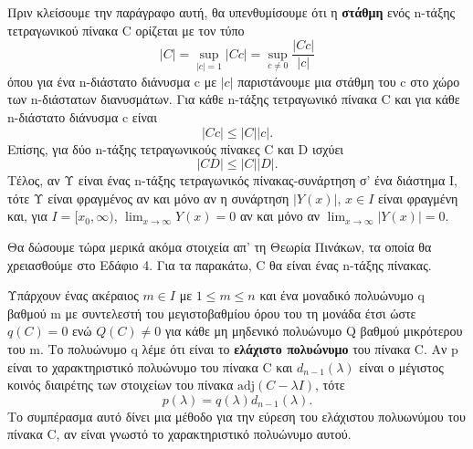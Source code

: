 \documentclass[11pt,a4paper,twoside]{book}
\begin{document}
Πριν κλείσουμε την παράγραφο αυτή, θα υπενθυμίσουμε ότι η \textbf{στάθμη} ενός n-τάξης τετραγωνικού πίνακα C ορίζεται με τον τύπο
\[
|C| = \sup_{|c|=1} |Cc| = \sup_{c\neq 0} \frac{|Cc|}{|c|}
\]
όπου για ένα n-διάστατο διάνυσμα c με $|c|$ παριστάνουμε μια στάθμη του c στο χώρο των n-διάστατων διανυσμάτων. Για κάθε n-τάξης τετραγωνικό πίνακα C και για κάθε n-διάστατο διάνυσμα c είναι
\[
|Cc| \leq |C||c|.
\]
Επίσης, για δύο n-τάξης τετραγωνικούς πίνακες C και D ισχύει
\[
|CD| \leq |C||D|.
\]
Τέλος, αν Υ είναι ένας n-τάξης τετραγωνικός πίνακας-συνάρτηση σ' ένα διάστημα Ι, τότε Υ είναι φραγμένος αν και μόνο αν η συνάρτηση $|Y(x)|$, $x \in I$ είναι φραγμένη και, για $I=[x_0, \infty)$, $\lim_{x\to\infty} Y(x) = 0$ αν και μόνο αν $\lim_{x\to\infty} |Y(x)| = 0$.

Θα δώσουμε τώρα μερικά ακόμα στοιχεία απ' τη Θεωρία Πινάκων, τα οποία θα χρειασθούμε στο Εδάφιο 4. Για τα παρακάτω, C θα είναι ένας n-τάξης πίνακας.

Υπάρχουν ένας ακέραιος $m \in I$ με $1 \leq m \leq n$ και ένα μοναδικό πολυώνυμο q βαθμού m με συντελεστή του μεγιστοβαθμίου όρου του τη μονάδα έτσι ώστε $q(C)=0$ ενώ $Q(C) \neq 0$ για κάθε μη μηδενικό πολυώνυμο Q βαθμού μικρότερου του m. Το πολυώνυμο q λέμε ότι είναι το \textbf{ελάχιστο πολυώνυμο} του πίνακα C. Αν p είναι το χαρακτηριστικό πολυώνυμο του πίνακα C και $d_{n-1}(\lambda)$ είναι ο μέγιστος κοινός διαιρέτης των στοιχείων του πίνακα $\text{adj}(C-\lambda I)$, τότε
\[
p(\lambda) = q(\lambda) d_{n-1}(\lambda).
\]
Το συμπέρασμα αυτό δίνει μια μέθοδο για την εύρεση του ελάχιστου πολυωνύμου του πίνακα C, αν είναι γνωστό το χαρακτηριστικό πολυώνυμο αυτού.
\end{document}
